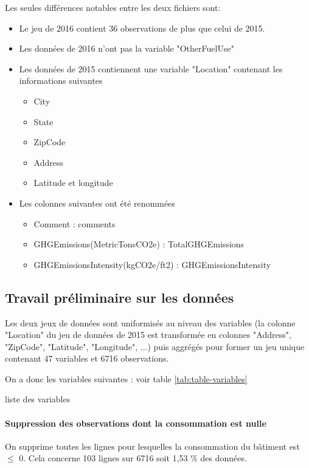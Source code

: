 Les seules différences notables entre les deux fichiers sont:
\begin{itemize}
  \item{Le jeu de 2016 contient 36 observations de plus que celui de 2015.}
  \item{Les données de 2016 n'ont pas la variable "OtherFuelUse"}
  \item{Les données de 2015 contiennent une variable "Location" contenant les
       informations suivantes}
  \begin{itemize}
    \item{City}
    \item{State}
    \item{ZipCode}
    \item{Address}
    \item{Latitude et longitude}
  \end{itemize}
  \item{Les colonnes suivantes ont été renommées}
  \begin{itemize}
    \item{Comment : comments}
    \item{GHGEmissions(MetricTonsCO2e) : TotalGHGEmissions}
    \item{GHGEmissionsIntensity(kgCO2e/ft2) : GHGEmissionsIntensity}
  \end{itemize}
\end{itemize}

\subsection{Travail préliminaire sur les données}

Les deux jeux de données sont uniformisés au niveau des variables
(la colonne "Location" du jeu de données de 2015 est transformée en colonnes
"Address", "ZipCode", "Latitude", "Longitude", ...) puis aggrégés pour former
un jeu unique contenant 47 variables et 6716 observations.

On a donc les variables suivantes :
  voir table \ref{tab:table-variables}

\begin{table}[p]
  \caption{liste des variables}
  \label{tab:table-variables}

\end{table}

\paragraph{Suppression des observations dont la consommation est nulle}
On supprime toutes les lignes pour lesquelles la consommation du bâtiment est $\le$ 0.
Cela concerne 103 lignes sur 6716 soit 1,53 \% des données.

